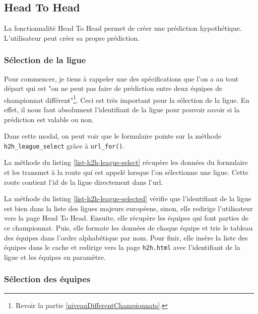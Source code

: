 \documentclass[a4paper,14pt]{extarticle}
\begin{document}
{\subsection{Head To Head}

La fonctionnalité Head To Head permet de créer une prédiction hypothétique. L'utilisateur peut créer sa propre prédiction.

\subsubsection{Sélection de la ligue}
\label{selectionLigueH2H}

Pour commencer, je tiens à rappeler une des spécifications que l'on a au tout départ qui est "on ne peut pas faire de prédiction entre deux équipes de championnat différent"\footnote{Revoir la partie \ref{niveauDifferentChampionnats}.}. Ceci est très important pour la sélection de la ligue. En effet, il nous faut absolument l'identifiant de la ligue pour pouvoir savoir si la prédiction est valable ou non.


Dans cette modal, on peut voir que le formulaire pointe sur la méthode \texttt{h2h\_league\_select} grâce à \texttt{url\_for()}. 

La méthode du listing \ref{list-h2h-league-select} récupère les données du formulaire et les transmet à la route qui est appelé lorsque l'on sélectionne une ligue. Cette route contient l'id de la ligue directement dans l'url. 


La méthode du listing \ref{list-h2h-league-selected} vérifie que l'identifiant de la ligue est bien dans la liste des ligues majeurs européens, sinon, elle redirige l'utilisateur vers la page Head To Head. Ensuite, elle récupère les équipes qui font parties de ce championnat. Puis, elle formate les données de chaque équipe et trie le tableau des équipes dans l'ordre alphabétique par nom. Pour finir, elle insère la liste des équipes dans le cache et redirige vers la page \texttt{h2h.html} avec l'identifiant de la ligue et les équipes en paramètre.


\subsubsection{Sélection des équipes}

}
\end{document}
